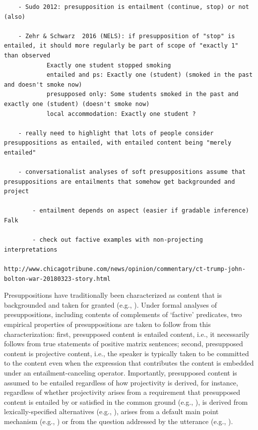 \documentclass[11pt,fleqn]{article}
\newcommand{\6}{\mbox{$[\hspace*{-.6mm}[$}}
\newcommand{\9}{\mbox{$]\hspace*{-.6mm}]$}}
\begin{document}
{\begin{verbatim}
	- Sudo 2012: presupposition is entailment (continue, stop) or not (also)
	
	- Zehr & Schwarz  2016 (NELS): if presupposition of "stop" is entailed, it should more regularly be part of scope of "exactly 1" than observed
			Exactly one student stopped smoking
			entailed and ps: Exactly one (student) (smoked in the past and doesn't smoke now) 
			presupposed only: Some students smoked in the past and exactly one (student) (doesn't smoke now)
			local accommodation: Exactly one student ?
			
	- really need to highlight that lots of people consider presuppositions as entailed, with entailed content being "merely entailed"
	
	- conversationalist analyses of soft presuppositions assume that presuppositions are entailments that somehow get backgrounded and project 

		- entailment depends on aspect (easier if gradable inference) Falk
		
		- check out factive examples with non-projecting interpretations
		
http://www.chicagotribune.com/news/opinion/commentary/ct-trump-john-bolton-war-20180323-story.html

\end{verbatim}

Presuppositions have traditionally been characterized as content that is backgrounded and taken for granted (e.g., \citealt{stalnaker74,ccmg90}). Under formal analyses of presuppositions, including contents of complements of `factive' predicates, two empirical properties of presuppositions are taken to follow from this characterization: first, presupposed content is entailed content, i.e., it necessarily follows from true statements of positive matrix sentences; second, presupposed content is projective content, i.e., the speaker is typically taken to be committed to the content even when the expression that contributes the content is embedded under an entailment-canceling operator. Importantly, presupposed content is assumed to be entailed regardless of how projectivity is derived, for instance, regardless of whether projectivity arises from a requirement that presupposed content is entailed by or satisfied in the common ground (e.g., \citealt{heim83,vds92}),  is derived  from lexically-specified alternatives (e.g., \citealt{abusch10,romoli2015}), arises from a default main point mechanism (e.g., \citealt{abrusan2011,abrusan2016}) or from the question addressed by the utterance (e.g., \citealt{best-question}). 

}
\end{document}
